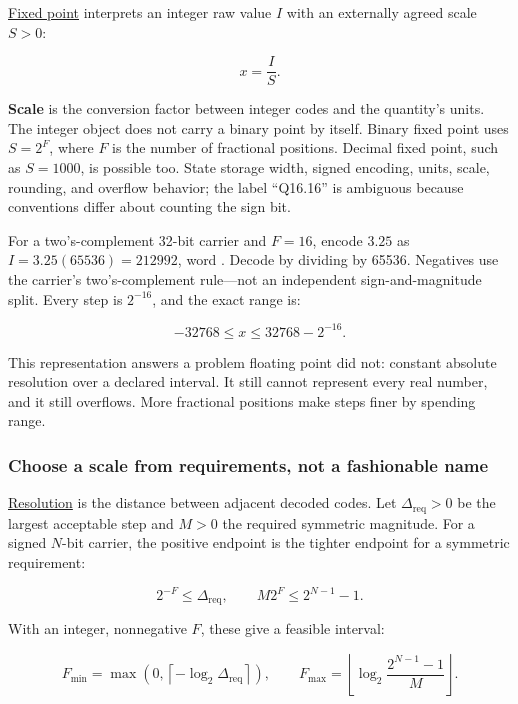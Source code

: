 \hyperref[appendix-1d0dbe8924cc]{Fixed point} interprets an integer raw value \(I\) with an externally agreed scale \(S>0\):

\[
x=\frac{I}{S}.
\]

\textbf{Scale} is the conversion factor between integer codes and the quantity's units. The integer object does not carry a binary point by itself. Binary fixed point uses \(S=2^F\), where \(F\) is the number of fractional positions. Decimal fixed point, such as \(S=1000\), is possible too. State storage width, signed encoding, units, scale, rounding, and overflow behavior; the label ``Q16.16'' is ambiguous because conventions differ about counting the sign bit.

For a two's-complement 32-bit carrier and \(F=16\), encode \(3.25\) as \(I=3.25(65536)=212992\), word . Decode by dividing by 65536. Negatives use the carrier's two's-complement rule---not an independent sign-and-magnitude split. Every step is \(2^{-16}\), and the exact range is:

\[
-32768\le x\le32768-2^{-16}.
\]

This representation answers a problem floating point did not: constant absolute resolution over a declared interval. It still cannot represent every real number, and it still overflows. More fractional positions make steps finer by spending range.

\subsubsection{Choose a scale from requirements, not a fashionable name}\label{01-foundations-i-ch001-choose-a-scale-from-requirements-not-a-fashionable-name}

\hypertarget{01-foundations-i-ch001-choose-a-scale-from-requirements-not-a-fashionable-name}{}

\hyperref[appendix-ceb4c4a9b5a1]{Resolution} is the distance between adjacent decoded codes. Let \(\Delta_{\mathrm{req}}>0\) be the largest acceptable step and \(M>0\) the required symmetric magnitude. For a signed \(N\)-bit carrier, the positive endpoint is the tighter endpoint for a symmetric requirement:

\[
2^{-F}\le\Delta_{\mathrm{req}},
\qquad
M2^F\le2^{N-1}-1.
\]

With an integer, nonnegative \(F\), these give a feasible interval:

\[
F_{\min}=\max\!\left(0,\left\lceil-\log_2\Delta_{\mathrm{req}}\right\rceil\right),
\qquad
F_{\max}=\left\lfloor\log_2\frac{2^{N-1}-1}{M}\right\rfloor.
\]

